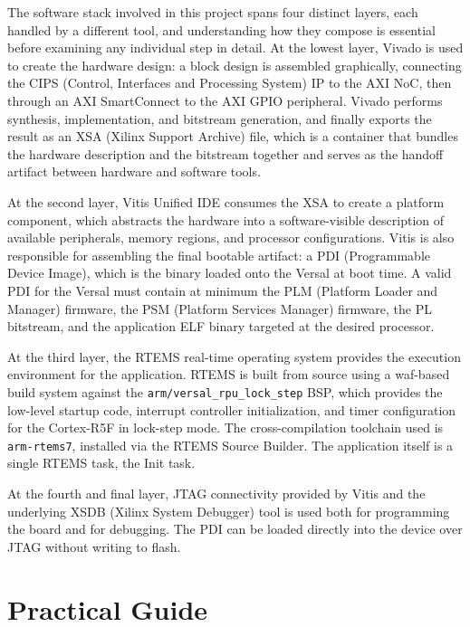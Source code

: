 \documentclass[
	a4paper,
]{CSMakotoTechnicalReport}
\begin{document}
The software stack involved in this project spans four distinct layers, each handled by a different tool, and understanding how they compose is essential before examining any individual step in detail.
At the lowest layer, Vivado is used to create the hardware design: a block design is assembled graphically, connecting the CIPS (Control, Interfaces and Processing System) IP to the AXI NoC, then through an AXI SmartConnect to the AXI GPIO peripheral.
Vivado performs synthesis, implementation, and bitstream generation, and finally exports the result as an XSA (Xilinx Support Archive) file, which is a container that bundles the hardware description and the bitstream together and serves as the handoff artifact between hardware and software tools.

At the second layer, Vitis Unified IDE consumes the XSA to create a platform component, which abstracts the hardware into a software-visible description of available peripherals, memory regions, and processor configurations.
Vitis is also responsible for assembling the final bootable artifact: a PDI (Programmable Device Image), which is the binary loaded onto the Versal at boot time.
A valid PDI for the Versal must contain at minimum the PLM (Platform Loader and Manager) firmware, the PSM (Platform Services Manager) firmware, the PL bitstream, and the application ELF binary targeted at the desired processor.

At the third layer, the RTEMS real-time operating system provides the execution environment for the application.
RTEMS is built from source using a waf-based build system against the \texttt{arm/versal\_rpu\_lock\_step} BSP, which provides the low-level startup code, interrupt controller initialization, and timer configuration for the Cortex-R5F in lock-step mode.
The cross-compilation toolchain used is \texttt{arm-rtems7}, installed via the RTEMS Source Builder.
The application itself is a single RTEMS task, the Init task.

At the fourth and final layer, JTAG connectivity provided by Vitis and the underlying XSDB (Xilinx System Debugger) tool is used both for programming the board and for debugging.
The PDI can be loaded directly into the device over JTAG without writing to flash.


\section{Practical Guide}
\label{ch:guide}
\end{document}
